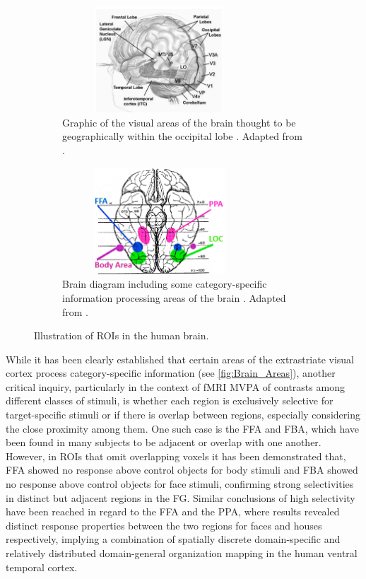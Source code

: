 \begin{figure}[htbp]
 	\centering
	\begin{subfigure}{0.49\textwidth}
		\centering
		\includegraphics[width = 0.8\textwidth, height = 4cm]{assets/images/visual_areas.png}
		\caption{Graphic of the visual areas of the brain thought to be geographically within the occipital lobe \cite{visual_centers}. Adapted from .}
		\label{fig:Visual_areas}
	\end{subfigure}
	\hfill
	\begin{subfigure}{0.49\textwidth}
		\centering
	 	\includegraphics[width = 0.8\textwidth, height = 4cm]{assets/images/brain_areas.png}
		\caption{Brain diagram including some category-specific information processing areas of the brain \cite{prosopagnosia}. Adapted from \cite{brain_areas}.}
		\label{fig:Specific_areas}
	\end{subfigure}
	\caption[Brain Regions of Interest]{Illustration of \gls{ROIs} in the human brain.}
 	\label{fig:Brain_Areas}
\end{figure}

While it has been clearly established that certain areas of the extrastriate visual cortex process category-specific information (see \autoref{fig:Brain_Areas}), another critical inquiry, particularly in the context of \gls{fMRI} \gls{MVPA} of contrasts among different classes of stimuli, is whether each region is exclusively selective for target-specific stimuli or if there is overlap between regions, especially considering the close proximity among them. One such case is the \gls{FFA} and \gls{FBA}, which have been found in many subjects to be adjacent or overlap with one another. However, in \gls{ROIs} that omit overlapping voxels it has been demonstrated \cite{Schwarzlose2005} that, \gls{FFA} showed no response above control objects for body stimuli and \gls{FBA} showed no response above control objects for face stimuli, confirming strong selectivities in distinct but adjacent regions in the \gls{FG}. Similar conclusions of high selectivity have been reached \cite{Mengjin2022} in regard to the \gls{FFA} and the \gls{PPA}, where results revealed distinct response properties between the two regions for faces and houses respectively, implying a combination of spatially discrete domain-specific and relatively distributed domain-general organization mapping in the human ventral temporal cortex.

